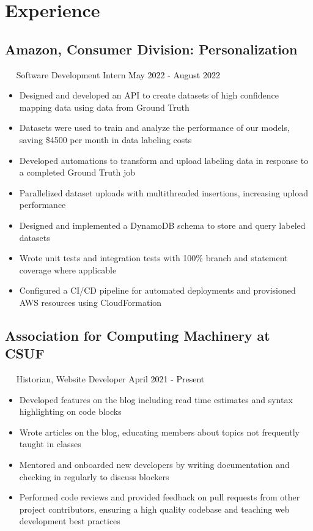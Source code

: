 \documentclass{article}
\newcommand{\resumesection}[3]{
    \subsection*{#1}
    \ 
    \ 
    \small
    \textcolor{csufgrey}{#2}
    \normalsize
    \hfill
    \textcolor{black}{#3}
    \normalsize
}
\begin{document}
\section*{Experience}
\resumesection{Amazon, Consumer Division: Personalization}{Software Development Intern}{May 2022 - August 2022}
\begin{itemize}
    \item Designed and developed an API to create datasets of high confidence mapping data using data from Ground Truth
    \item Datasets were used to train and analyze the performance of our models, saving \$4500 per month in data labeling costs
    \item Developed automations to transform and upload labeling data in response to a completed Ground Truth job
    \item Parallelized dataset uploads with multithreaded insertions, increasing upload performance
    \item Designed and implemented a DynamoDB schema to store and query labeled datasets
    \item Wrote unit tests and integration tests with 100\% branch and statement coverage where applicable
    \item Configured a CI/CD pipeline for automated deployments and provisioned AWS resources using CloudFormation
\end{itemize}
\resumesection{Association for Computing Machinery at CSUF}{Historian, Website Developer}{April 2021 - Present}
\begin{itemize}
    \item Developed features on the blog including read time estimates and syntax highlighting on code blocks
    \item Wrote articles on the blog, educating members about topics not frequently taught in classes
    \item Mentored and onboarded new developers by writing documentation and checking in regularly to discuss blockers
    \item Performed code reviews and provided feedback on pull requests from other project contributors, ensuring a high quality codebase and teaching web development best practices
\end{itemize}
\end{document}

